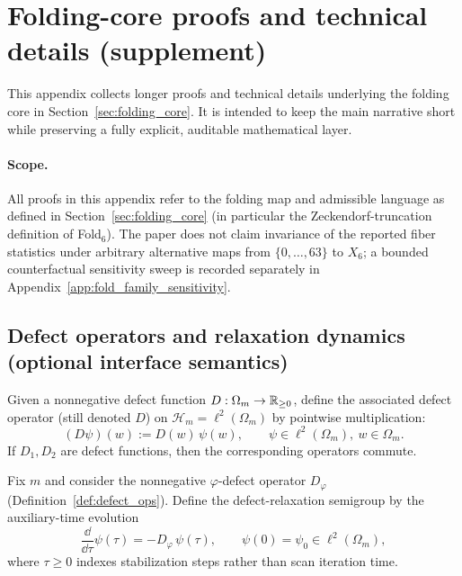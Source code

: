 \section{Folding-core proofs and technical details (supplement)}
\label{app:folding_core_proofs}

This appendix collects longer proofs and technical details underlying the folding core in Section~\ref{sec:folding_core}.
It is intended to keep the main narrative short while preserving a fully explicit, auditable mathematical layer.

\paragraph{Scope.}
All proofs in this appendix refer to the folding map and admissible language as defined in Section~\ref{sec:folding_core} (in particular the Zeckendorf-truncation definition of Fold$_6$).
The paper does not claim invariance of the reported fiber statistics under arbitrary alternative maps from $\{0,\dots,63\}$ to $X_6$; a bounded counterfactual sensitivity sweep is recorded separately in Appendix~\ref{app:fold_family_sensitivity}.

\subsection{Defect operators and relaxation dynamics (optional interface semantics)}
\label{app:defect_relaxation}

\begin{definition}\label{def:defect_ops}
Given a nonnegative defect function $D:\Omega_m\to\mathbb{R}_{\ge 0}$, define the associated defect operator (still denoted $D$) on $\mathcal{H}_m=\ell^2(\Omega_m)$ by pointwise multiplication:
\[
(D\psi)(w):=D(w)\,\psi(w),\qquad \psi\in\ell^2(\Omega_m),\ w\in\Omega_m.
\]
If $D_1,D_2$ are defect functions, then the corresponding operators commute.
\end{definition}

\begin{definition}\label{def:defect_relaxation}
Fix $m$ and consider the nonnegative $\varphi$-defect operator $D_\varphi$ (Definition~\ref{def:defect_ops}).
Define the defect-relaxation semigroup by the auxiliary-time evolution
\begin{equation}
\label{eq:defect_relaxation_semigroup}
\frac{\dd}{\dd\tau}\psi(\tau)=-D_\varphi\,\psi(\tau),
\qquad
\psi(0)=\psi_0\in\ell^2(\Omega_m),
\end{equation}
where $\tau\ge 0$ indexes stabilization steps rather than scan iteration time.
\end{definition}

